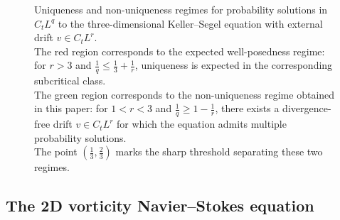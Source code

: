\documentclass[10pt,a4paper]{amsart}
\numberwithin{equation}{section}
\def\geq{\geqslant}
\def\leq{\leqslant}
\def\geq{\geqslant}
\def\leq{\leqslant}
\begin{document}
\begin{figure}
    \centering
   
\caption{
Uniqueness and non-uniqueness regimes for probability solutions in
$C_tL^q$ to the three-dimensional Keller--Segel equation with external drift
$v\in C_tL^r$. \\
The red region corresponds to the expected well-posedness regime: for $r>3$
and $\frac1q\leq \frac13+\frac1r$, uniqueness is expected in the corresponding
subcritical class.  \\
The green region corresponds to the non-uniqueness regime
obtained in this paper: for $1<r<3$ and
$\frac1q\geq 1-\frac1r$, there exists a divergence-free drift
$v\in C_tL^r$ for which the equation admits multiple probability solutions.\\
The point $(\frac13,\frac23)$ marks the sharp threshold separating these
two regimes.
}
\label{tu:sde}
\end{figure}

 \subsection{The 2D vorticity Navier--Stokes equation}
\end{document}
